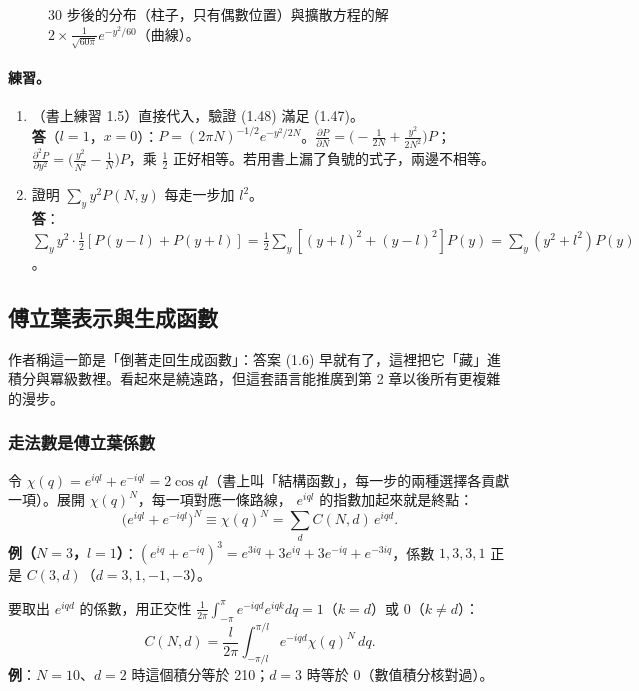 \begin{figure}[H]
\centering
\FigDiffusion
\caption{30 步後的分布（柱子，只有偶數位置）與擴散方程的解 $2\times\frac{1}{\sqrt{60\pi}}e^{-y^2/60}$（曲線）。}
\label{fig:diffusion}
\end{figure}

\paragraph{練習。}
\begin{enumerate}[label=(\alph*)]
\item （書上練習 1.5）直接代入，驗證 (1.48) 滿足 (1.47)。\\
  \textbf{答}（$l=1$，$x=0$）：$P=(2\pi N)^{-1/2}e^{-y^2/2N}$。$\frac{\partial P}{\partial N}=\big(-\frac1{2N}+\frac{y^2}{2N^2}\big)P$；
  $\frac{\partial^2P}{\partial y^2}=\big(\frac{y^2}{N^2}-\frac1N\big)P$，乘 $\frac12$ 正好相等。若用書上漏了負號的式子，兩邊不相等。
\item 證明 $\sum_yy^2P(N,y)$ 每走一步加 $l^2$。\\
  \textbf{答}：$\sum_yy^2\cdot\frac12[P(y-l)+P(y+l)]=\frac12\sum_y[(y+l)^2+(y-l)^2]P(y)=\sum_y(y^2+l^2)P(y)$。
\end{enumerate}

\subsection{傅立葉表示與生成函數}

作者稱這一節是「倒著走回生成函數」：答案 (1.6) 早就有了，這裡把它「藏」進積分與冪級數裡。看起來是繞遠路，但這套語言能推廣到第 2 章以後所有更複雜的漫步。

\subsubsection*{走法數是傅立葉係數}
令 $\chi(q)=e^{iql}+e^{-iql}=2\cos ql$（書上叫「結構函數」，每一步的兩種選擇各貢獻一項）。展開 $\chi(q)^N$，每一項對應一條路線，
$e^{iql}$ 的指數加起來就是終點：
\begin{equation}
\big(e^{iql}+e^{-iql}\big)^N\equiv\chi(q)^N=\sum_dC(N,d)\,e^{iqd}. \tag{1.50}
\end{equation}
\textbf{例（$N=3$，$l=1$）}：$(e^{iq}+e^{-iq})^3=e^{3iq}+3e^{iq}+3e^{-iq}+e^{-3iq}$，係數 $1,3,3,1$ 正是 $C(3,d)$（$d=3,1,-1,-3$）。

要取出 $e^{iqd}$ 的係數，用正交性 $\frac1{2\pi}\int_{-\pi}^{\pi}e^{-iqd}e^{iqk}dq=1$（$k=d$）或 $0$（$k\ne d$）：
\begin{equation}
C(N,d)=\frac{l}{2\pi}\int_{-\pi/l}^{\pi/l}e^{-iqd}\chi(q)^N\,dq. \tag{1.51}
\end{equation}
\textbf{例}：$N=10$、$d=2$ 時這個積分等於 210；$d=3$ 時等於 0（數值積分核對過）。


